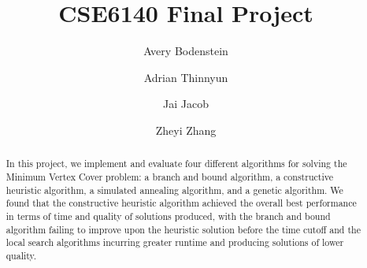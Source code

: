 \documentclass[acmlarge]{acmart}
\begin{document}
\title{CSE6140 Final Project}

\author{Avery Bodenstein}

\author{Adrian Thinnyun}
\authornotemark[1]

\author{Jai Jacob}
\authornotemark[1]

\author{Zheyi Zhang}
\authornotemark[1]


\begin{abstract}
  In this project, we implement and evaluate four different algorithms for solving the Minimum Vertex Cover problem: a branch and bound algorithm, a constructive heuristic algorithm, a simulated annealing algorithm, and a genetic algorithm. We found that the constructive heuristic algorithm achieved the overall best performance in terms of time and quality of solutions produced, with the branch and bound algorithm failing to improve upon the heuristic solution before the time cutoff and the local search algorithms incurring greater runtime and producing solutions of lower quality.
\end{abstract}
\end{document}
